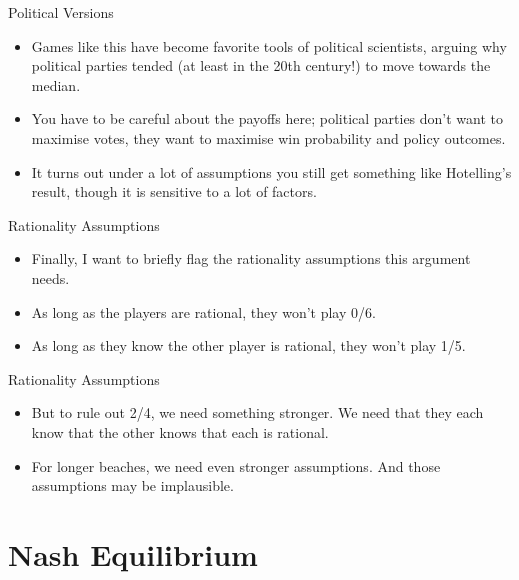 \documentclass[
  14pt,
  letterpaper,
  ignorenonframetext,
  aspectratio=169,
  handout]{beamer}
\providecommand{\tightlist}{%
  \setlength{\itemsep}{0pt}\setlength{\parskip}{0pt}}\usepackage{longtable,booktabs,array}
\let\olditem\item
\renewcommand{\item}{%
\olditem\vspace{6pt}}
\begin{document}
\begin{frame}{Political Versions}
\protect\hypertarget{political-versions}{}
\begin{itemize}[<+->]
\tightlist
\item
  Games like this have become favorite tools of political scientists,
  arguing why political parties tended (at least in the 20th century!)
  to move towards the median.
\item
  You have to be careful about the payoffs here; political parties don't
  want to maximise votes, they want to maximise win probability and
  policy outcomes.
\item
  It turns out under a lot of assumptions you still get something like
  Hotelling's result, though it is sensitive to a lot of factors.
\end{itemize}
\end{frame}

\begin{frame}{Rationality Assumptions}
\protect\hypertarget{rationality-assumptions}{}
\begin{itemize}[<+->]
\tightlist
\item
  Finally, I want to briefly flag the rationality assumptions this
  argument needs.
\item
  As long as the players are rational, they won't play 0/6.
\item
  As long as they know the other player is rational, they won't play
  1/5.
\end{itemize}
\end{frame}

\begin{frame}{Rationality Assumptions}
\protect\hypertarget{rationality-assumptions-1}{}
\begin{itemize}[<+->]
\tightlist
\item
  But to rule out 2/4, we need something stronger. We need that they
  each know that the other knows that each is rational.
\item
  For longer beaches, we need even stronger assumptions. And those
  assumptions may be implausible.
\end{itemize}
\end{frame}

\hypertarget{nash-equilibrium}{%
\section{Nash Equilibrium}\label{nash-equilibrium}}
\end{document}
